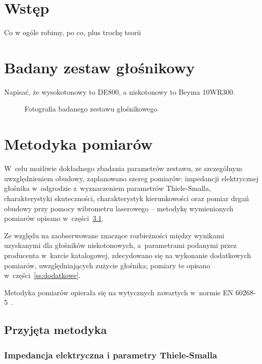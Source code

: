 \documentclass[12pt]{oska}
\affiliation{Akademia Górniczo-Hutnicza im. S. Staszica w Krakowie}
\begin{document}
\maketitles

\section{Wstęp}

	\color{orange} Co w ogóle robimy, po co, plus trochę teorii
	\color{black}

\section{Badany zestaw głośnikowy}

	\color{orange} Napisać, że wysokotonowy to DE800, a niskotonowy to Beyma 10WR300.
	\color{black}

	\begin{figure}[h!]
		\centering
		\caption{Fotografia badanego zestawu głośnikowego}
		\label{r:zdjecie}
	\end{figure}


\section{Metodyka pomiarów}

	W~celu możliwie dokładnego zbadania parametrów zestawu, ze szczególnym uwzględnieniem obudowy, zaplanowano szereg pomiarów: impedancji elektrycznej głośnika w~odgrodzie z~wyznaczeniem parametrów Thiele-Smalla, charakterystyki skuteczności, charakterystyk kierunkowości oraz pomiar drgań obudowy przy pomocy wibrometru laserowego -- metodykę wymienionych pomiarów opisano w~części~\ref{ss:metodyka}.
	
	Ze względu na zaobserwowane znaczące rozbieżności między wynikami uzyskanymi dla głośników niskotonowych, a~parametrami podanymi przez producenta w~karcie katalogowej, zdecydowano się na wykonanie dodatkowych pomiarów, uwzględniających zużycie głośnika; pomiary te opisano w~części~\ref{ss:dodatkowe}.
	
	Metodyka pomiarów opierała się na wytycznych zawartych w~normie EN 60268-5~\cite{norma}.

	\subsection{Przyjęta metodyka}\label{ss:metodyka}
	
		\subsubsection{Impedancja elektryczna i parametry Thiele-Smalla}
			
\end{document}
